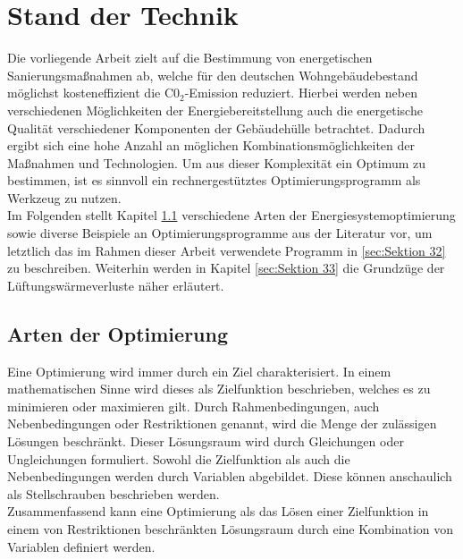 \chapter{Stand der Technik}

Die vorliegende Arbeit zielt auf die Bestimmung von energetischen Sanierungsmaßnahmen ab, welche für den deutschen Wohngebäudebestand möglichst kosteneffizient die C0\(_2\)-Emission reduziert.
Hierbei werden neben verschiedenen Möglichkeiten der Energiebereitstellung auch die energetische Qualität verschiedener Komponenten der Gebäudehülle betrachtet.
Dadurch ergibt sich eine hohe Anzahl an möglichen Kombinationsmöglichkeiten der Maßnahmen und Technologien.
Um aus dieser Komplexität ein Optimum zu bestimmen, ist es sinnvoll ein rechnergestütztes Optimierungsprogramm als Werkzeug zu nutzen.\\
Im Folgenden stellt Kapitel \ref{sec:Sektion 31} verschiedene Arten der Energiesystemoptimierung sowie diverse Beispiele an Optimierungsprogramme aus der Literatur vor, um letztlich das im Rahmen dieser Arbeit verwendete Programm in \ref{sec:Sektion 32} zu beschreiben. Weiterhin werden in Kapitel \ref{sec:Sektion 33} die Grundzüge der Lüftungswärmeverluste näher erläutert.

\section{Arten der Optimierung}
\label{sec:Sektion 31}

Eine Optimierung wird immer durch ein Ziel charakterisiert.
In einem mathematischen Sinne wird dieses als Zielfunktion beschrieben, welches es zu minimieren oder maximieren gilt.
Durch Rahmenbedingungen, auch Nebenbedingungen oder Restriktionen genannt, wird die Menge der zulässigen Lösungen beschränkt.
Dieser Lösungsraum wird durch Gleichungen oder Ungleichungen formuliert.
Sowohl die Zielfunktion als auch die Nebenbedingungen werden durch Variablen abgebildet.
Diese können anschaulich als Stellschrauben beschrieben werden. \cite{Schellong.2016}\\
Zusammenfassend kann eine Optimierung als das Lösen einer Zielfunktion in einem von Restriktionen beschränkten Lösungsraum durch eine Kombination von Variablen definiert werden. 

